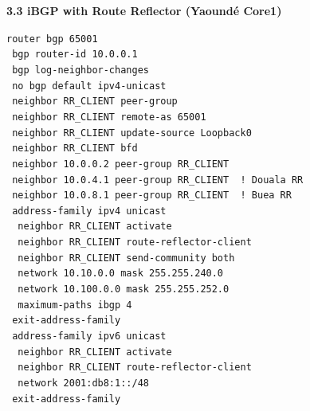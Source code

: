 \documentclass[11pt]{article}
\begin{document}
\begin{exoresolu}
\medskip
\textbf{3.3 iBGP with Route Reflector (Yaoundé Core1)}\par
\texttt{router bgp 65001}\\
\texttt{\ bgp router-id 10.0.0.1}\\
\texttt{\ bgp log-neighbor-changes}\\
\texttt{\ no bgp default ipv4-unicast}\\
\texttt{\ neighbor RR\_CLIENT peer-group}\\
\texttt{\ neighbor RR\_CLIENT remote-as 65001}\\
\texttt{\ neighbor RR\_CLIENT update-source Loopback0}\\
\texttt{\ neighbor RR\_CLIENT bfd}\\
\texttt{\ neighbor 10.0.0.2 peer-group RR\_CLIENT}\\
\texttt{\ neighbor 10.0.4.1 peer-group RR\_CLIENT\ \ ! Douala RR}\\
\texttt{\ neighbor 10.0.8.1 peer-group RR\_CLIENT\ \ ! Buea RR}\\
\texttt{\ address-family ipv4 unicast}\\
\texttt{\ \ neighbor RR\_CLIENT activate}\\
\texttt{\ \ neighbor RR\_CLIENT route-reflector-client}\\
\texttt{\ \ neighbor RR\_CLIENT send-community both}\\
\texttt{\ \ network 10.10.0.0 mask 255.255.240.0}\\
\texttt{\ \ network 10.100.0.0 mask 255.255.252.0}\\
\texttt{\ \ maximum-paths ibgp 4}\\
\texttt{\ exit-address-family}\\
\texttt{\ address-family ipv6 unicast}\\
\texttt{\ \ neighbor RR\_CLIENT activate}\\
\texttt{\ \ neighbor RR\_CLIENT route-reflector-client}\\
\texttt{\ \ network 2001:db8:1::/48}\\
\texttt{\ exit-address-family}


\end{exoresolu}
\end{document}
